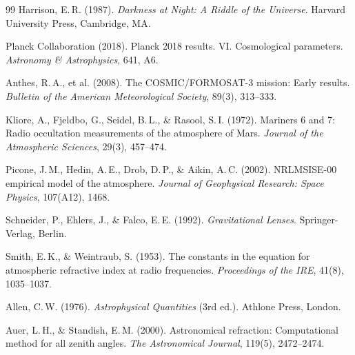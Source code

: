 ﻿\documentclass[12pt,a4paper]{article}
\begin{document}
\begin{thebibliography}{99}
Harrison, E.\,R. (1987).
\newblock \textit{Darkness at Night: A Riddle of the Universe}.
\newblock Harvard University Press, Cambridge, MA.

Planck Collaboration (2018).
\newblock Planck 2018 results. VI. Cosmological parameters.
\newblock \textit{Astronomy \& Astrophysics}, 641, A6.
\newblock {}

Anthes, R.\,A., et al. (2008).
\newblock The COSMIC/FORMOSAT-3 mission: Early results.
\newblock \textit{Bulletin of the American Meteorological Society}, 89(3),
  313--333.
\newblock {}

Kliore, A., Fjeldbo, G., Seidel, B.\,L., \& Rasool, S.\,I. (1972).
\newblock Mariners 6 and 7: Radio occultation measurements of the atmosphere
  of Mars.
\newblock \textit{Journal of the Atmospheric Sciences}, 29(3), 457--474.

Picone, J.\,M., Hedin, A.\,E., Drob, D.\,P., \& Aikin, A.\,C. (2002).
\newblock NRLMSISE-00 empirical model of the atmosphere.
\newblock \textit{Journal of Geophysical Research: Space Physics}, 107(A12),
  1468.
\newblock {}

Schneider, P., Ehlers, J., \& Falco, E.\,E. (1992).
\newblock \textit{Gravitational Lenses}.
\newblock Springer-Verlag, Berlin.
\newblock {}

Smith, E.\,K., \& Weintraub, S. (1953).
\newblock The constants in the equation for atmospheric refractive index at
  radio frequencies.
\newblock \textit{Proceedings of the IRE}, 41(8), 1035--1037.
\newblock {}


Allen, C.\,W. (1976).
\newblock \textit{Astrophysical Quantities} (3rd ed.).
\newblock Athlone Press, London.

Auer, L.\,H., \& Standish, E.\,M. (2000).
\newblock Astronomical refraction: Computational method for all zenith angles.
\newblock \textit{The Astronomical Journal}, 119(5), 2472--2474.
\newblock {}


\end{thebibliography}
\end{document}
